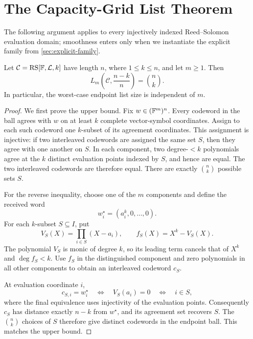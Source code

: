 \section{The Capacity-Grid List Theorem}

The following argument applies to every injectively indexed Reed--Solomon
evaluation domain; smoothness enters only when we instantiate the explicit
family from \cref{sec:explicit-family}.

\begin{theorem}
\label{thm:capacity-grid-exact}
Let \(\mathcal C=\operatorname{RS}[\mathbb{F},\mathcal L,k]\) have length \(n\), where
\(1\le k\le n\), and let \(m\ge1\).  Then
\[
  L_m\left(\mathcal C,\frac{n-k}{n}\right)=\binom nk .
\]
In particular, the worst-case endpoint list size is independent of \(m\).
\end{theorem}

\begin{proof}
We first prove the upper bound.  Fix \(w\in(\mathbb{F}^m)^n\).
Every codeword in the ball agrees with \(w\) on at least \(k\) complete
vector-symbol coordinates.  Assign to each such codeword one \(k\)-subset of
its agreement coordinates.  This assignment is injective: if two interleaved
codewords are assigned the same set \(S\), then they agree with one another on
\(S\).  In each component, two degree-\(<k\) polynomials agree at the \(k\)
distinct evaluation points indexed by \(S\), and hence are equal.  The two
interleaved codewords are therefore equal.  There are exactly \(\binom nk\)
possible sets \(S\).

For the reverse inequality, choose one of the \(m\) components and define the
received word
\[
  w_i^\star=(a_i^k,0,\ldots,0).
\]
For each \(k\)-subset \(S\subseteq I\), put
\[
  V_S(X)=\prod_{i\in S}(X-a_i),
  \qquad
  f_S(X)=X^k-V_S(X).
\]
The polynomial \(V_S\) is monic of degree \(k\), so its leading term cancels
that of \(X^k\) and \(\deg f_S<k\).  Use \(f_S\) in the distinguished
component and zero polynomials in all other components to obtain an
interleaved codeword \(c_S\).

At evaluation coordinate \(i\),
\[
  c_{S,i}=w_i^\star
  \quad\Longleftrightarrow\quad
  V_S(a_i)=0
  \quad\Longleftrightarrow\quad
  i\in S,
\]
where the final equivalence uses injectivity of the evaluation points.
Consequently \(c_S\) has distance exactly \(n-k\) from \(w^\star\), and its
agreement set recovers \(S\).  The \(\binom nk\) choices of \(S\) therefore
give distinct codewords in the endpoint ball.  This matches the upper bound.
\end{proof}

